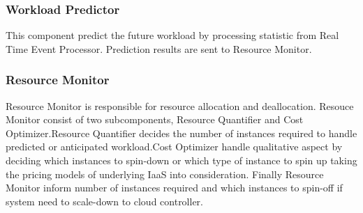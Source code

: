 \subsubsection{Workload Predictor}
This component predict the future workload by processing statistic from Real Time Event Processor. Prediction results are sent to Resource Monitor.

\subsubsection{Resource Monitor}
Resource Monitor is responsible for resource allocation and deallocation. Resouce Monitor consist of two subcomponents, Resource Quantifier and Cost Optimizer.Resource Quantifier decides the number of instances required to handle predicted or anticipated workload.Cost Optimizer handle qualitative aspect by deciding which instances to spin-down or which type of instance to spin up taking the pricing models of underlying IaaS into consideration. Finally Resource Monitor inform number of instances required and which instances to spin-off if system need to scale-down to cloud controller.
